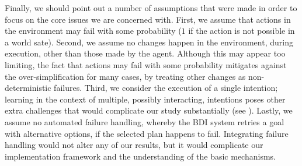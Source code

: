 Finally, we should point out a number of assumptions that were made in order to
focus on the core issues we are concerned with.
First, we assume that actions in the environment may fail with some probability
($1$ if the action is not possible in a world sate).
Second, we assume no changes happen in the environment, during execution, other
than those made by the agent. Although this may appear too limiting, the fact
that actions may fail with some probability mitigates against the
over-simplification for many cases, by treating other changes as
non-deterministic failures.
Third, we consider the execution of a single intention; learning in the context
of multiple, possibly interacting, intentions poses other extra challenges that
would complicate our study substantially (see \cite{Thangarajah02}).
Lastly, we assume no automated failure handling, whereby the BDI system retries
a goal with alternative options, if the selected plan happens to fail. 
Integrating failure handling would not alter any of our results, but it would
complicate our implementation framework and the understanding of the basic
mechanisms.



% 
% 
% 



